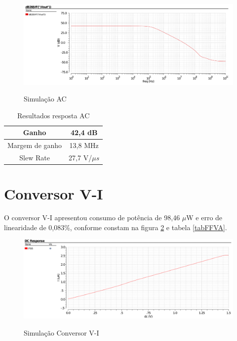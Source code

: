 \documentclass[
	12pt,				%
	oneside,			%
	a4paper,			%
	english,			%
	french,				%
	spanish,			%
	brazil				%
	]{abntex2}
\begin{document}
\begin{figure}[!ht]
  \centering
  \includegraphics[width=450pt]{OTA_AC.png}\\
  \caption{Simulação AC}\label{resAC}
\end{figure}

\begin{table}[h]
    \begin{center}    
    \begin{tabular}{ | c | c | }
    \hline
    Ganho  & 42,4 dB \\
    \hline
    Margem de ganho  & 13,8 MHz \\ 
    \hline
    Slew Rate  & 27,7 V/$\mu s$ \\
    \hline
    \end{tabular}
    \caption[Resultados resposta AC]{Resultados resposta AC}
    \label{tabAC}
    \end{center}
\end{table}

\clearpage

\section{Conversor V-I}
O conversor V-I apresentou consumo de potência de 98,46 $\mu$W e erro de linearidade de 0,083\%, conforme constam na figura \ref{resFFVA} e tabela \ref{tabFFVA}.

\begin{figure}[!ht]
  \centering
  \includegraphics[width=450pt]{resFFVA.png}\\
  \caption{Simulação Conversor V-I}\label{resFFVA}
\end{figure}
\end{document}
